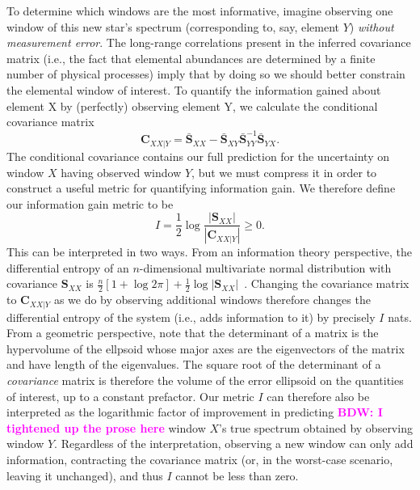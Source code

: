 \documentclass[a4paper,fleqn,usenatbib]{mnras}
\newcommand{\speccov}{{\bm S}}
\newcommand{\condcov}{{\bm C}}
\newcommand{\bdw}[1]{\textbf{\textcolor{magenta}{BDW: #1}}}
\begin{document}
To determine which windows are the most informative, imagine observing one window of this new star's spectrum (corresponding to, say, element $Y$) {\it without measurement error}. The long-range correlations present in the inferred covariance matrix (i.e., the fact that elemental abundances are determined by a finite number of physical processes) imply that by doing so we should better constrain the elemental window of interest. To quantify the information gained about element X by (perfectly) observing element Y, we calculate the conditional covariance matrix
\begin{equation}
\condcov_{XX|Y} = \bar{\speccov}_{XX} - \bar{\speccov}_{XY} \bar{\speccov}_{YY}^{-1} \bar{\speccov}_{YX}.
\end{equation}
The conditional covariance contains our full prediction for the uncertainty on window $X$ having observed window $Y$, but we must compress it in order to construct a useful metric for quantifying information gain. We therefore define our information gain metric to be
\begin{equation}
I = \frac{1}{2} \log \frac{ \left| \speccov_{XX} \right| }{ \left| \condcov_{XX|Y} \right| } \ge 0.
\end{equation}
This can be interpreted in two ways. From an information theory perspective, the differential entropy of an $n$-dimensional multivariate normal distribution with covariance $\speccov_{XX}$ is $\frac{n}{2} \left[1 + \log 2\pi \right] + \frac{1}{2} \log |\speccov_{XX}|$~\citep[see, e.g.,][Chapter 9]{Cover_Thomas:2006}. Changing the covariance matrix to $\condcov_{XX|Y}$ as we do by observing additional windows therefore changes the differential entropy of the system (i.e., adds information to it) by precisely $I$ nats. From a geometric perspective, note that the determinant of a matrix is the hypervolume of the ellpsoid whose major axes are the eigenvectors of the matrix and have length of the eigenvalues. The square root of the determinant of a {\it covariance} matrix is therefore the volume of the error ellipsoid on the quantities of interest, up to a constant prefactor. Our metric $I$ can therefore also be interpreted as the logarithmic factor of improvement in predicting \bdw{I tightened up the  prose here}
window $X$'s true spectrum obtained by observing window $Y$. Regardless of the interpretation, observing a new window can only add information, contracting the covariance matrix (or, in the worst-case scenario, leaving it unchanged), and thus $I$ cannot be less than zero.
\end{document}
